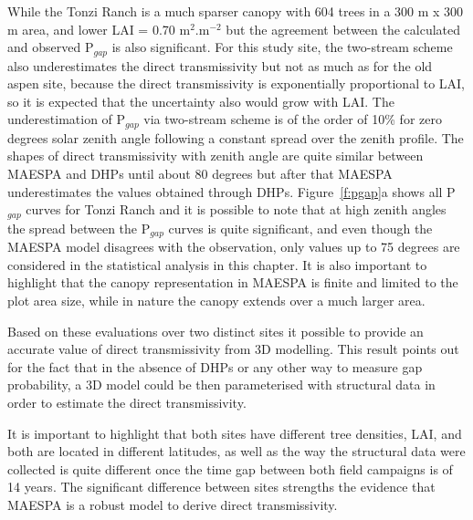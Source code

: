 \documentclass[a4paper,11pt]{report}
\begin{document}
While the Tonzi Ranch is a much sparser canopy with 604 trees in a 300 m x 300 m area, and lower LAI = 0.70 m$^{2}$.m$^{-2}$ but the agreement between the calculated and observed P$_{gap}$ is also significant. For this study site, the two-stream scheme also underestimates the direct transmissivity but not as much as for the old aspen site, because the direct transmissivity is exponentially proportional to LAI, so it is expected that the uncertainty also would grow with LAI. The underestimation of P$_{gap}$ via two-stream scheme is of the order of 10\% for zero degrees solar zenith angle following a constant spread over the zenith profile. The shapes of direct transmissivity with zenith angle are quite similar between MAESPA and DHPs until about 80 degrees but after that MAESPA underestimates the values obtained through DHPs. Figure~\ref{f:pgap}a shows all P$_{gap}$ curves for Tonzi Ranch and it is possible to note that at high zenith angles the spread between the P$_{gap}$ curves is quite significant, and even though the MAESPA model disagrees with the observation, only values up to 75 degrees are considered in the statistical analysis in this chapter. It is also important to highlight that the canopy representation in MAESPA is finite and limited to the plot area size, while in nature the canopy extends over a much larger area.

Based on these evaluations over two distinct sites it possible to provide an accurate value of direct transmissivity from 3D modelling. This result points out for the fact that in the absence of DHPs or any other way to measure gap probability, a 3D model could be then parameterised with structural data in order to estimate the direct transmissivity. 

It is important to highlight that both sites have different tree densities, LAI, and both are located in different latitudes, as well as the way the structural data were collected is quite different once the time gap between both field campaigns is of 14 years. The significant difference between sites strengths the evidence that MAESPA is a robust model to derive direct transmissivity.
\end{document}
